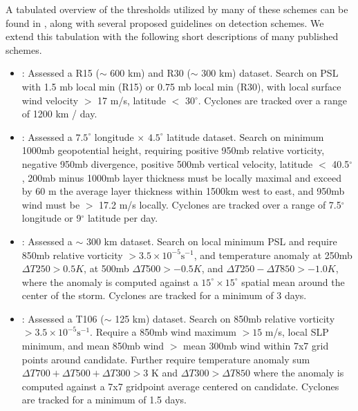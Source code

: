 \documentclass[gmdd, hvmath, online]{copernicus_discussions}
\begin{document}
A tabulated overview of the thresholds utilized by many of these schemes can be found in \cite{walsh2007objectively}, along with several proposed guidelines on detection schemes.  We extend this tabulation with the following short descriptions of many published schemes.

\begin{itemize}
\item \cite{broccoli1990existing}: Assessed a R15 ($\sim$ 600 km) and R30 ($\sim$ 300 km) dataset.  Search on PSL with 1.5 mb local min (R15) or 0.75 mb local min (R30), with local surface wind velocity $>$ 17 m/s, latitude $<$ 30$^\circ$.  Cyclones are tracked over a range of 1200 km / day.

\item \cite{wu1992gcm}: Assessed a $7.5^\circ$ longitude $\times$ $4.5^\circ$ latitude dataset.  Search on minimum 1000mb geopotential height, requiring positive 950mb relative vorticity, negative 950mb divergence, positive 500mb vertical velocity, latitude $<$ 40.5$^\circ$, 200mb minus 1000mb layer thickness must be locally maximal and exceed by 60 m the average layer thickness within 1500km west to east, and 950mb wind must be $>$ 17.2 m/s locally.  Cyclones are tracked over a range of 7.5$^\circ$ longitude or 9$^\circ$ latitude per day.

\item \cite{haarsma1993tropical}: Assessed a $\sim$ 300 km dataset.  Search on local minimum PSL and require 850mb relative vorticity $> 3.5 \times 10^{-5} \mbox{s}^{-1}$, and temperature anomaly at 250mb $\Delta T250 > 0.5 K$, at 500mb $\Delta T500 > -0.5 K$, and $\Delta T250 - \Delta T850 > -1.0 K$, where the anomaly is computed against a $15^\circ \times 15^\circ$ spatial mean around the center of the storm.  Cyclones are tracked for a minimum of 3 days.

\item \cite{bengtsson1995hurricane, bengtsson1996will}:  Assessed a T106 ($\sim$ 125 km) dataset.  Search on 850mb relative vorticity $> 3.5 \times 10^{-5} \mbox{s}^{-1}$.  Require a 850mb wind maximum $> 15$ m/s, local SLP minimum, and mean 850mb wind $>$ mean 300mb wind within 7x7 grid points around candidate.  Further require temperature anomaly sum $\Delta T700+ \Delta T500+ \Delta T300 > 3$ K and $\Delta T300 > \Delta T850$ where the anomaly is computed against a 7x7 gridpoint average centered on candidate.  Cyclones are tracked for a minimum of 1.5 days.


\end{itemize}
\end{document}

